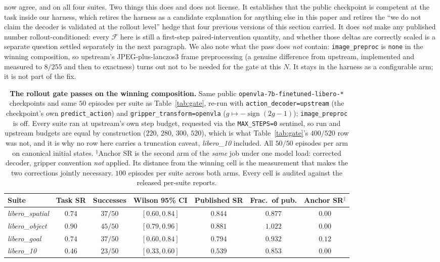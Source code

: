 \documentclass{article}
\begin{document}
now agree, and on all four suites. Two things this does and does not license. It establishes that the public checkpoint is competent at the task inside our harness, which retires the harness as a candidate explanation for anything else in this paper and retires the ``we do not claim the decoder is validated at the rollout level'' hedge that four previous versions of this section carried. It does \emph{not} make any published number rollout-conditioned: every $\mathcal{F}$ here is still a first-step paired-intervention quantity, and whether those deltas are correctly scaled is a separate question settled separately in the next paragraph. We also note what the pass does \emph{not} contain: \texttt{image\_preproc} is \texttt{none} in the winning composition, so upstream's JPEG-plus-lanczos3 frame preprocessing (a genuine difference from upstream, implemented and measured to $8/255$ and then to exactness) turns out not to be needed for the gate at this $N$. It stays in the harness as a configurable arm; it is not part of the fix.

\begin{table}[t]
\centering\small
\caption{\textbf{The rollout gate passes on the winning composition.} Same public \texttt{openvla-7b-finetuned-libero-*} checkpoints and same $50$ episodes per suite as Table~\ref{tab:gate}, re-run with \texttt{action\_decoder=upstream} (the checkpoint's own \texttt{predict\_action}) and \texttt{gripper\_transform=openvla} ($g \mapsto -\operatorname{sign}(2g{-}1)$); \texttt{image\_preproc} is off. Every suite ran at upstream's own step budget, requested via the \texttt{MAX\_STEPS=0} sentinel, so run and upstream budgets are equal by construction ($220$, $280$, $300$, $520$), which is what Table~\ref{tab:gate}'s $400/520$ row was not, and it is why no row here carries a truncation caveat, \emph{libero\_10} included. All $50/50$ episodes per arm on canonical initial states. $^\ddagger$Anchor SR is the second arm of the \emph{same} job under one model load: corrected decoder, gripper convention \emph{not} applied. Its distance from the winning cell is the measurement that makes the two corrections jointly necessary. $100$ episodes per suite across both arms. Every cell is audited against the released per-suite reports.}
\label{tab:gate_pass}
\begin{tabular}{lcccccc}
\toprule
Suite & Task SR & Successes & Wilson 95\% CI & Published SR & Frac.\ of pub. & Anchor SR$^\ddagger$ \\
\midrule
\emph{libero\_spatial} & $\mathbf{0.74}$ & $37/50$ & $[0.60, 0.84]$ & $0.844$ & $0.877$ & $0.00$ \\
\emph{libero\_object}  & $\mathbf{0.90}$ & $45/50$ & $[0.79, 0.96]$ & $0.881$ & $1.022$ & $0.00$ \\
\emph{libero\_goal}    & $\mathbf{0.74}$ & $37/50$ & $[0.60, 0.84]$ & $0.794$ & $0.932$ & $0.12$ \\
\emph{libero\_10}      & $\mathbf{0.46}$ & $23/50$ & $[0.33, 0.60]$ & $0.539$ & $0.853$ & $0.00$ \\
\bottomrule
\end{tabular}
\end{table}
\end{document}
